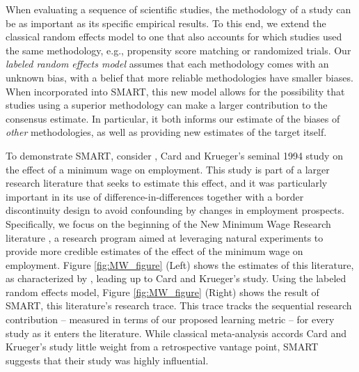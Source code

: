 When evaluating a sequence of scientific studies, the methodology of a study can be as important as its specific empirical results. 
 To this end, we extend the classical random effects model to one that also accounts for which studies used the same methodology, e.g., propensity score matching or randomized trials. Our \textit{labeled random effects model} assumes that each methodology comes with an unknown bias, with a belief that more reliable methodologies have smaller biases. When incorporated into SMART, this new model allows for the possibility that studies using a superior methodology can make a larger contribution to the consensus estimate. In particular, it both informs our estimate of the biases of \textit{other} methodologies, as well as providing new estimates of the target itself.

 To demonstrate SMART, consider \citep{Card_Krueger_94}, Card and Krueger's seminal 1994 study on the effect of a minimum wage on employment. This study is part of a larger research literature that seeks to estimate this effect, and it was particularly important in its use of difference-in-differences together with a border discontinuity design to avoid confounding by changes in employment prospects.  Specifically, we focus on the beginning of the New Minimum Wage Research literature \citep{Ehrenberg_92}, a research program aimed at leveraging natural experiments to provide more credible estimates of the effect of the minimum wage on employment. Figure
\ref{fig:MW_figure} (Left) shows the estimates of this literature, as characterized by \citep{Neumark_Shirley_22}, leading up to Card and Krueger's study.
Using the labeled random effects model, Figure \ref{fig:MW_figure} (Right) shows the result of SMART, this literature's research trace. This trace tracks the sequential research contribution -- measured in terms of our proposed learning metric -- for every study as it enters the literature. 
While classical meta-analysis accords Card and Krueger's study little weight from a retrospective vantage point, SMART suggests that their study was highly influential.

